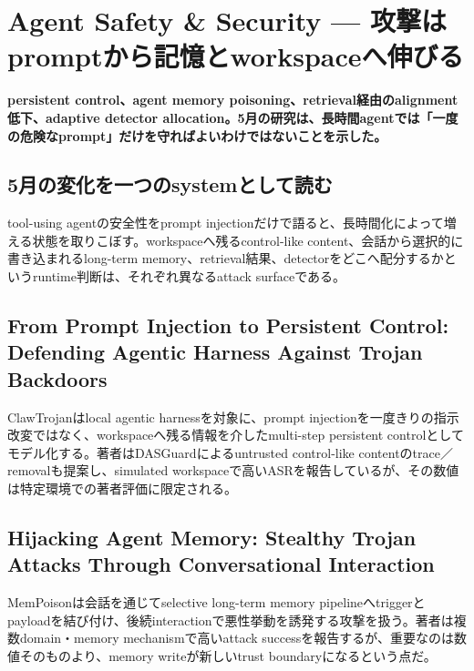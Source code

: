 \section{Agent Safety \& Security — 攻撃はpromptから記憶とworkspaceへ伸びる}
\label{pkg:agent-safety-security-may}
\noindent\textbf{persistent control、agent memory poisoning、retrieval経由のalignment低下、adaptive detector allocation。5月の研究は、長時間agentでは「一度の危険なprompt」だけを守ればよいわけではないことを示した。}\autocite{src-062c2718dd96,src-7fa0ea6bcf47,src-b818bca6d4b6,src-f216d6cd7707}

\subsection{5月の変化を一つのsystemとして読む}

tool-using agentの安全性をprompt injectionだけで語ると、長時間化によって増える状態を取りこぼす。workspaceへ残るcontrol-like content、会話から選択的に書き込まれるlong-term memory、retrieval結果、detectorをどこへ配分するかというruntime判断は、それぞれ異なるattack surfaceである。\autocite{src-062c2718dd96,src-7fa0ea6bcf47,src-b818bca6d4b6,src-f216d6cd7707}


\subsection{From Prompt Injection to Persistent Control: Defending Agentic Harness Against Trojan Backdoors}

ClawTrojanはlocal agentic harnessを対象に、prompt injectionを一度きりの指示改変ではなく、workspaceへ残る情報を介したmulti-step persistent controlとしてモデル化する。著者はDASGuardによるuntrusted control-like contentのtrace／removalも提案し、simulated workspaceで高いASRを報告しているが、その数値は特定環境での著者評価に限定される。\autocite{src-7fa0ea6bcf47}


\subsection{Hijacking Agent Memory: Stealthy Trojan Attacks Through Conversational Interaction}

MemPoisonは会話を通じてselective long-term memory pipelineへtriggerとpayloadを結び付け、後続interactionで悪性挙動を誘発する攻撃を扱う。著者は複数domain・memory mechanismで高いattack successを報告するが、重要なのは数値そのものより、memory writeが新しいtrust boundaryになるという点だ。\autocite{src-f216d6cd7707}


